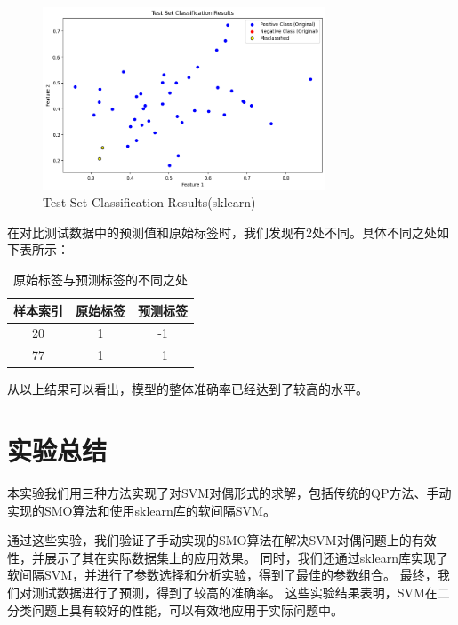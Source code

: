 \documentclass[12pt]{article}
\begin{document}
\begin{figure}[htbp]
  \centering
  \includegraphics[width=0.75\textwidth]{figures/sklearn_test.png}
  \caption{Test Set Classification Results(sklearn)}
  \label{sklearn_test}
\end{figure}


在对比测试数据中的预测值和原始标签时，我们发现有2处不同。具体不同之处如下表所示：

\begin{table}[h]
  \centering
  \begin{tabular}{ccc}
    \toprule
    样本索引 & 原始标签 & 预测标签 \\
    \midrule
    20   & 1    & -1   \\
    77   & 1    & -1   \\
    \bottomrule
  \end{tabular}
  \caption{原始标签与预测标签的不同之处}
\end{table}

从以上结果可以看出，模型的整体准确率已经达到了较高的水平。

\section{实验总结}
本实验我们用三种方法实现了对SVM对偶形式的求解，包括传统的QP方法、手动实现的SMO算法和使用sklearn库的软间隔SVM。

通过这些实验，我们验证了手动实现的SMO算法在解决SVM对偶问题上的有效性，并展示了其在实际数据集上的应用效果。
同时，我们还通过sklearn库实现了软间隔SVM，并进行了参数选择和分析实验，得到了最佳的参数组合。
最终，我们对测试数据进行了预测，得到了较高的准确率。
这些实验结果表明，SVM在二分类问题上具有较好的性能，可以有效地应用于实际问题中。

\newpage
\appendix
\end{document}
